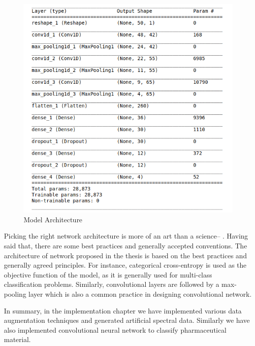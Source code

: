 \begin{figure}[ht]
	\begin{center}
		\includegraphics[width=\textwidth]{images/Convolution_model.png}
		\caption{Model Architecture}
		\label{fig:Convolution model}
	\end{center}
\end{figure}

Picking the right network architecture is more of an art than a science-- \citep{chollet2017deep}. Having said that, there are some best practices and generally accepted conventions. The architecture of network proposed in the thesis is based on the best practices and generally agreed principles. For instance, categorical cross-entropy is used as the objective function of the model, as it is generally used for multi-class classification problems. Similarly, convolutional layers are followed by a max-pooling layer which is also a common practice in designing convolutional network. 

In summary, in the implementation chapter we have implemented various data augmentation techniques and generated artificial spectral data. Similarly we have also implemented convolutional neural network to classify pharmaceutical material. 